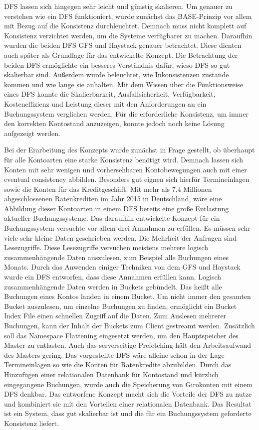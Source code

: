 \documentclass[12pt,oneside,a4paper,parskip]{scrbook}
\begin{document}
DFS lassen sich hingegen sehr leicht und günstig skalieren. Um genauer zu verstehen wie ein DFS funktioniert, wurde zunächst das BASE-Prinzip vor allem mit Bezug auf die Konsistenz durchleuchtet. Demnach muss nicht komplett auf Konsistenz verzichtet werden, um die Systeme verfügbarer zu machen. Daraufhin wurden die beiden DFS GFS und Haystack genauer betrachtet. Diese dienten auch später als Grundlage für das entwickelte Konzept. Die Betrachtung der beiden DFS ermöglichte ein besseres Verständnis dafür, wieso DFS so gut skalierbar sind. Außerdem wurde beleuchtet, wie Inkonsistenzen zustande kommen und wie lange sie anhalten. Mit dem Wissen über die Funktionsweise eines DFS konnte die Skalierbarkeit, Ausfallsicherheit, Verfügbarkeit, Kosteneffizienz und Leistung dieser mit den Anforderungen an ein Buchungssystem verglichen werden. Für die erforderliche Konsistenz, um immer den korrekten Kontostand anzuzeigen, konnte jedoch noch keine Lösung aufgezeigt werden.

Bei der Erarbeitung des Konzepts wurde zunächst in Frage gestellt, ob überhaupt für alle Kontoarten eine starke Konsistenz benötigt wird. Demnach lassen sich Konten mit sehr wenigen und vorhersehbaren Kontobewegungen auch mit einer eventual consistency abbilden. Besonders gut eignen sich hierfür Termineinlagen sowie die Konten für das Kreditgeschäft. Mit mehr als 7,4 Millionen abgeschlossenen Ratenkrediten im Jahr 2015 in Deutschland, wäre eine Abbildung dieser Kontoarten in einem DFS bereits eine große Entlastung aktueller Buchungssysteme. Das daraufhin entwickelte Konzept für ein Buchungssystem versuchte vor allem drei Annahmen zu erfüllen. Es müssen sehr viele sehr kleine Daten geschrieben werden. Die Mehrheit der Anfragen sind Lesezugriffe. Diese Lesezugriffe versuchen meistens mehrere logisch zusammenhängende Daten auszulesen, zum Beispiel alle Buchungen eines Monats. Durch das Anwenden einiger Techniken von dem GFS und Haystack wurde ein DFS entworfen, dass diese Annahmen erfüllen kann. Logisch zusammenhängende Daten werden in Buckets gebündelt. Das heißt alle Buchungen eines Kontos landen in einem Bucket. Um nicht immer den gesamten Bucket auszulesen, um einzelne Buchungen zu finden, ermöglicht ein Bucket Index File einen schnellen Zugriff auf die Daten. Zum Auslesen mehrerer Buchungen, kann der Inhalt der Buckets zum Client gestreamt werden. Zusätzlich soll das Namespace Flattening eingesetzt werden, um den Hauptspeicher des Master zu entlasten. Auch das serverseitige Prefetching hält den Arbeitsaufwand des Masters gering. Das vorgestellte DFS wäre alleine schon in der Lage Termineinlagen so wie die Konten für Ratenkredite abzubilden. Durch das Hinzufügen einer relationalen Datenbank für Kontostand und kürzlich eingegangene Buchungen, wurde auch die Speicherung von Girokonten mit einem DFS denkbar. Das entworfene Konzept macht sich die Vorteile der DFS zu nutze und kombiniert sie mit den Vorteilen einer relationalen Datenbank. Das Resultat ist ein System, dass gut skalierbar ist und die für ein Buchungssystem geforderte Konsistenz liefert.
\end{document}
